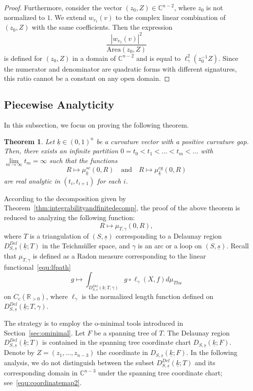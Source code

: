 \documentclass{compositio}
\numberwithin{equation}{section}
\numberwithin{figure}{section}
\theoremstyle{definition}
\theoremstyle{plain}
\newtheorem{theorem}[definition]{Theorem}
\begin{document}
{\begin{proof}
    Furthermore, consider the vector $(z_0, Z) \in \mathbb{C}^{n-2}$, where $z_0$ is not normalized to $1$. We extend $w_{v_1}(v)$ to the complex linear combination of $(z_0, Z)$ with the same coefficients. Then the expression 
    $$
    \frac{|w_{v_1}(v)|^2}{\mathrm{Area}(z_0, Z)}
    $$ 
    is defined for $(z_0, Z)$ in a domain of $ \mathbb{C}^{n-2}$ and is equal to $\ell_{\gamma}^2(z_0^{-1} Z)$. Since the numerator and denominator are quadratic forms with different signatures, this ratio cannot be a constant on any open domain.
\end{proof}

\subsection{Piecewise Analyticity}\label{sec:analy}
In this subsection, we focus on proving the following theorem.
\begin{theorem}\label{thm:analytic}
    Let $\underline{k}\in (0,1)^n$ be a curvature vector with a positive curvature gap. Then, there exists an infinite partition $0 = t_0 < t_1 < \ldots < t_m < \ldots$ with $\lim\limits_{m \to \infty} t_m = \infty$ such that the functions
    $$
    R \mapsto \mu^{sc}_{\underline{k}}(0, R) \quad \text{and} \quad R \mapsto \mu^{cg}_{\underline{k}}(0, R)
    $$
    are real analytic in $(t_i, t_{i+1})$ for each $i$.
\end{theorem}

According to the decomposition given by Theorem~\ref{thm:integrabilityandfinitedecomp}, the proof of the above theorem is reduced to analyzing the following function:
$$
R \mapsto \mu_{T, \gamma}(0,R),
$$
where $T$ is a triangulation of $(S, \underline{s})$ corresponding to a Delaunay region $D_{S,\underline{s}}^{Del}(\underline{k};T)$ in the Teichm\"uller space, and $\gamma$ is an arc or a loop on $(S, \underline{s})$.  Recall that $\mu_{T,\gamma}$ is defined as a Radon measure corresponding to the linear functional~\eqref{equ:lfpath}
$$g \mapsto \int_{D_{S,\underline{s}}^{Del}(\underline{k};T, \gamma)}g\circ\ell _{\gamma}(X,f)d\mu_{Thu}$$
on $C_c(\mathbb{R}_{>0})$, where $\ell _{\gamma}$ is the normalized length function defined on $D_{S,\underline{s}}^{Del}(\underline{k};T, \gamma)$.

The strategy is to employ the o-minimal tools introduced in Section~\ref{sec:ominimal}. Let $F$ be a spanning tree of $T$. The Delaunay region $D_{S,\underline{s}}^{Del}(\underline{k};T)$ is contained in the spanning tree coordinate chart $D_{S,\underline{s}}(\underline{k};F)$. Denote by $Z=(z_1,\ldots,z_{n-3})$ the coordinate in $D_{S,\underline{s}}(\underline{k};F)$. In the following analysis, we do not distinguish between the subset $D_{S,\underline{s}}^{Del}(\underline{k};T)$ and its corresponding domain in $\mathbb{C}^{n-3}$ under the spanning tree coordinate chart;  see~\eqref{equ:coordinatemap2}.

}
\end{document}
